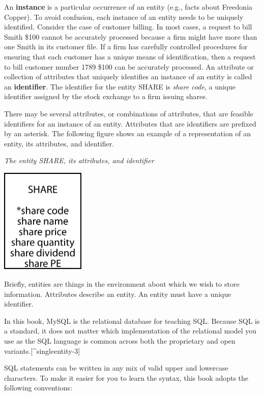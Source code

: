 \documentclass[
]{article}
\begin{document}
An \textbf{instance} is a particular occurrence of an entity (e.g.,
facts about Freedonia Copper). To avoid confusion, each instance of an
entity needs to be uniquely identified. Consider the case of customer
billing. In most cases, a request to bill Smith \$100 cannot be
accurately processed because a firm might have more than one Smith in
its customer file. If a firm has carefully controlled procedures for
ensuring that each customer has a unique means of identification, then a
request to bill customer number 1789 \$100 can be accurately processed.
An attribute or collection of attributes that uniquely identifies an
instance of an entity is called an \textbf{identifier}. The identifier
for the entity SHARE is \emph{share code}, a unique identifier assigned
by the stock exchange to a firm issuing shares.

There may be several attributes, or combinations of attributes, that are
feasible identifiers for an instance of an entity. Attributes that are
identifiers are prefixed by an asterisk. The following figure shows an
example of a representation of an entity, its attributes, and
identifier.

\emph{The entity SHARE, its attributes, and identifier}

\includegraphics[width=1.58333in,height=\textheight]{Figures/Chapter 3/share with identifier.png}

Briefly, entities are things in the environment about which we wish to
store information. Attributes describe an entity. An entity must have a
unique identifier.

In this book, MySQL is the relational database for teaching SQL. Because
SQL is a standard, it does not matter which implementation of the
relational model you use as the SQL language is common across both the
proprietary and open variants.{[}\^{}singleentity-3{]}

SQL statements can be written in any mix of valid upper and lowercase
characters. To make it easier for you to learn the syntax, this book
adopts the following conventions:
\end{document}
